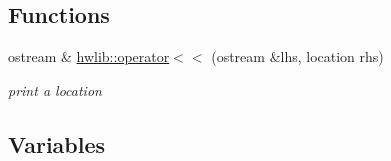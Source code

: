 \subsection*{Functions}
\begin{DoxyCompactItemize}
\item 
\mbox{\label{namespacehwlib_a72b3cd9bbd35ce5a8495b33af557d4ca}} 
ostream \& \hyperlink{namespacehwlib_a72b3cd9bbd35ce5a8495b33af557d4ca}{hwlib\+::operator$<$$<$} (ostream \&lhs, location rhs)
\begin{DoxyCompactList}\small\item\em print a location \end{DoxyCompactList}\end{DoxyCompactItemize}
\subsection*{Variables}
\textbf{ }\par

